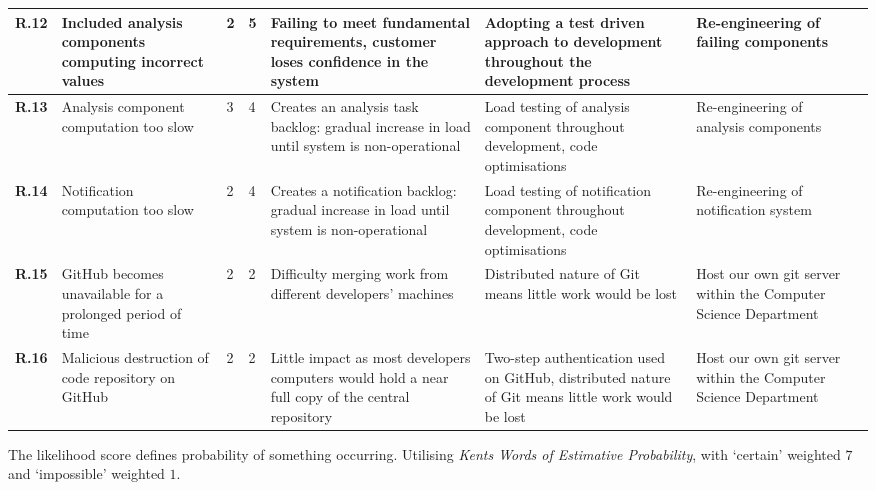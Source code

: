 \begin{longtable}[H]{| p{0.65cm} | p{2cm} | p{0.3cm} | p{0.3cm} | p{2.4cm} | p{3cm} | p{2.7cm} | p{0.4cm} |}
  \hline \textbf{R.12}
  & Included analysis components computing incorrect values
  & 2
  & 5
  & Failing to meet fundamental requirements, customer loses confidence in the system
  & Adopting a test driven approach to development throughout the development process
  & Re-engineering of failing components
  & \\
  
  \hline \textbf{R.13}
  & Analysis component computation too slow
  & 3
  & 4
  & Creates an analysis task backlog: gradual increase in load until system
  is non-operational
  & Load testing of analysis component throughout development, code optimisations 
  & Re-engineering of analysis components
  & \\  
  
  \hline \textbf{R.14}
  & Notification computation too slow
  & 2
  & 4
  & Creates a notification backlog: gradual increase in load until system
  is non-operational
  & Load testing of notification component throughout development, code optimisations 
  & Re-engineering of notification system
  & \\
  
  \hline \textbf{R.15}
  & GitHub becomes unavailable for a prolonged period of time
  & 2
  & 2
  & Difficulty merging work from different developers' machines
  & Distributed nature of Git means little work would be lost
  & Host our own git server within the Computer Science Department
  & \\ 
  
  \hline \textbf{R.16}
  & Malicious destruction of code repository on GitHub
  & 2
  & 2
  & Little impact as most developers computers would hold a near full copy of the central repository
  & Two-step authentication used on GitHub, distributed nature of Git means little work would be lost
  & Host our own git server within the Computer Science Department
  & \\    
    
  \hline
\end{longtable}       

The likelihood score defines probability of something occurring. Utilising
\textit{Kents Words of Estimative Probability}\cite{kent1966strategic}, with
`certain' weighted $7$ and `impossible' weighted $1$.

